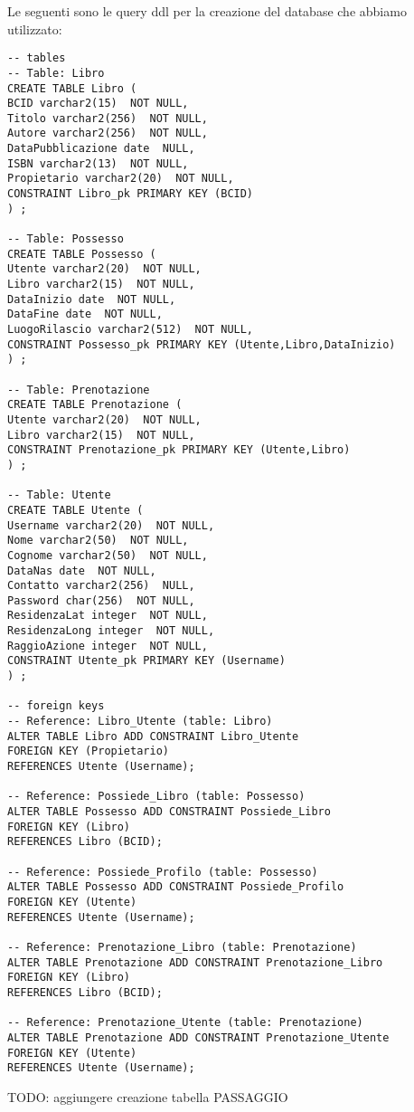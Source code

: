 Le seguenti sono le query ddl per la creazione del database che abbiamo utilizzato:
\begin{lstlisting}
-- tables
-- Table: Libro
CREATE TABLE Libro (
BCID varchar2(15)  NOT NULL,
Titolo varchar2(256)  NOT NULL,
Autore varchar2(256)  NOT NULL,
DataPubblicazione date  NULL,
ISBN varchar2(13)  NOT NULL,
Propietario varchar2(20)  NOT NULL,
CONSTRAINT Libro_pk PRIMARY KEY (BCID)
) ;

-- Table: Possesso
CREATE TABLE Possesso (
Utente varchar2(20)  NOT NULL,
Libro varchar2(15)  NOT NULL,
DataInizio date  NOT NULL,
DataFine date  NOT NULL,
LuogoRilascio varchar2(512)  NOT NULL,
CONSTRAINT Possesso_pk PRIMARY KEY (Utente,Libro,DataInizio)
) ;

-- Table: Prenotazione
CREATE TABLE Prenotazione (
Utente varchar2(20)  NOT NULL,
Libro varchar2(15)  NOT NULL,
CONSTRAINT Prenotazione_pk PRIMARY KEY (Utente,Libro)
) ;

-- Table: Utente
CREATE TABLE Utente (
Username varchar2(20)  NOT NULL,
Nome varchar2(50)  NOT NULL,
Cognome varchar2(50)  NOT NULL,
DataNas date  NOT NULL,
Contatto varchar2(256)  NULL,
Password char(256)  NOT NULL,
ResidenzaLat integer  NOT NULL,
ResidenzaLong integer  NOT NULL,
RaggioAzione integer  NOT NULL,
CONSTRAINT Utente_pk PRIMARY KEY (Username)
) ;

-- foreign keys
-- Reference: Libro_Utente (table: Libro)
ALTER TABLE Libro ADD CONSTRAINT Libro_Utente
FOREIGN KEY (Propietario)
REFERENCES Utente (Username);

-- Reference: Possiede_Libro (table: Possesso)
ALTER TABLE Possesso ADD CONSTRAINT Possiede_Libro
FOREIGN KEY (Libro)
REFERENCES Libro (BCID);

-- Reference: Possiede_Profilo (table: Possesso)
ALTER TABLE Possesso ADD CONSTRAINT Possiede_Profilo
FOREIGN KEY (Utente)
REFERENCES Utente (Username);

-- Reference: Prenotazione_Libro (table: Prenotazione)
ALTER TABLE Prenotazione ADD CONSTRAINT Prenotazione_Libro
FOREIGN KEY (Libro)
REFERENCES Libro (BCID);

-- Reference: Prenotazione_Utente (table: Prenotazione)
ALTER TABLE Prenotazione ADD CONSTRAINT Prenotazione_Utente
FOREIGN KEY (Utente)
REFERENCES Utente (Username);
\end{lstlisting}

TODO: aggiungere creazione tabella PASSAGGIO
